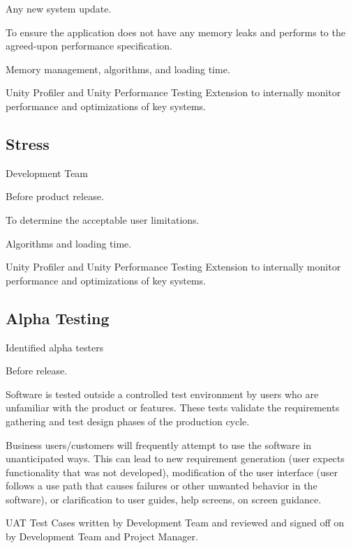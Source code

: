 \documentclass[letterpaper,10pt,english]{sphinxmanual}
\begin{document}
 Any new system update.

 To ensure the application does not have any memory leaks and performs to the agreed-upon performance specification.

 Memory management, algorithms, and loading time.

 Unity Profiler and Unity Performance Testing Extension to internally monitor performance and optimizations of key systems.


\subsection{Stress}
\label{\detokenize{test_plan/strategy:stress}}
 Development Team

 Before product release.

 To determine the acceptable user limitations.

 Algorithms and loading time.

 Unity Profiler and Unity Performance Testing Extension to internally monitor performance and optimizations of key systems.


\subsection{Alpha Testing}
\label{\detokenize{test_plan/strategy:alpha-testing}}
 Identified alpha testers

 Before release.

 Software is tested outside a controlled test environment by users who are unfamiliar with the product or features. These tests validate the requirements gathering and test design phases of the production cycle.

 Business users/customers will frequently attempt to use the software in unanticipated ways. This can lead to new requirement generation (user expects functionality that was not developed), modification of the user interface (user follows a use path that causes failures or other unwanted behavior in the software), or clarification to user guides, help screens, on screen guidance.

 UAT Test Cases written by Development Team and reviewed and signed off on by Development Team and Project Manager.
\end{document}
